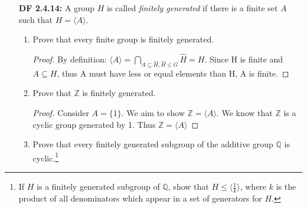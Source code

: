 \documentclass[11pt, oneside]{article}
\newcommand{\N}{\mathbb N}
\newcommand{\Z}{\mathbb Z}
\newcommand{\Q}{\mathbb Q}
\begin{document}
\begin{enumerate}
\begin{itemize}
\begin{proof}
Then we aim to show that $(B, *)$ is the smallest group. We shall first find the elements that are in $\langle A \rangle$: \begin{enumerate}
    \item Since elements of A are in a group, then any multiple of its elements are in the group as well, namely:
        \[\left\{ \dfrac{1}{\hat{p}} \bigg|\, \hat{p}\text{ is product of primes} \right\}\]
    \item In similar vein, the elements of A must have their multiple inverses: $(\dfrac{1}{p})^{-1}=p$ that are also in the group. By (a), the multiple of inverses are also in the group, namely:
    \[\left\{ \hat{q} \bigg|\, \hat{q}\text{ is product of primes} \right\}\]
    
    Since the group is closed under multiplication, also by the Fundamental Theorem of Arithmetic: "every positive integer greater than one can be written uniquely as a product of primes", we can combine both sets into one:
    \[\left\{\dfrac{q}{p}\bigg|\, \text{gcd(p,q)=1}, p,q\in \N \right\}\]
    Which turns out to be set B. Thus B is the smallest possible group that contain A. 

    
\end{enumerate}


    
\end{proof}
\end{itemize}

\newpage
\item [{\bf DF 2.4.14:}] A group $H$ is called {\it finitely generated} if there is a finite set $A$ such that $H=\langle A\rangle$. 
\begin{enumerate}
\item  Prove that every finite group is finitely generated. 
\begin{proof}
By definition: $\langle A \rangle = \bigcap_{A\subseteq \hat{H},  \hat{H}\leq G} \hat{H}=H$. Since H is finite and $A\subseteq H$, thus A must have less or equal elements than H, A is finite. 
\end{proof}
\item Prove that $\Z$ is finitely generated.
\begin{proof}
Consider $A=\{1\}$. We aim to show $\Z= \langle A \rangle$. We know that $\Z$ is a cyclic group generated by 1. Thus $\Z= \langle A \rangle$
\end{proof}
\item Prove that every finitely generated subgroup of the additive group $\Q$ is cyclic.\footnote{If $H$ is a finitely generated subgroup of $\Q$, show that $H\leq \langle \frac{1}{k}\rangle$, where $k$ is the product of all denominators which appear in a set of generators for $H$.}


\end{enumerate}
\end{enumerate}
\end{document}
